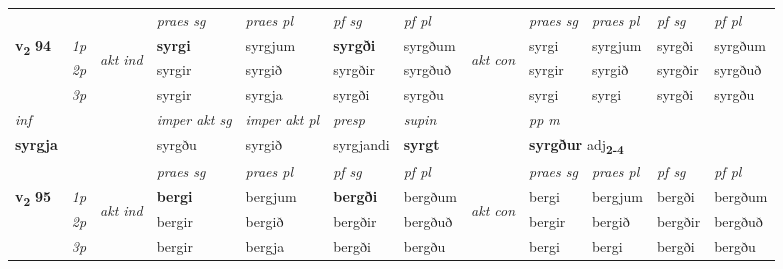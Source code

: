 \begin{longtable}[l]{X>{\footnotesize\itshape}llXXXXlXXXX}
\midrule

 & &   & \textit{praes sg}  & \textit{praes pl}    & \textit{ pf sg} & \textit{pf pl} & & \textit{praes sg}  & \textit{praes pl}    & \textit{pf sg} & \textit{pf pl }  \\ \cmidrule{4-7} \cmidrule{9-12}
 \multirow{2}{*}{{{\textbf{v{\textsubscript{2}}} \Large{\textbf{94}}}}}  & 1p & \multirow{3}{*}{\begin{turn}{90}\textit{akt ind}\end{turn}} & \textbf{syrgi} & syrgjum & \textbf{syrgði} & syrgðum & \multirow{3}{*}{\begin{turn}{90}\textit{akt con}\end{turn}} &syrgi & syrgjum & syrgði & syrgðum\\*
 & 2p &  &  syrgir  & syrgið & syrgðir & syrgðuð & & syrgir & syrgið & syrgðir & syrgðuð \\*
 & 3p &  & syrgir & syrgja & syrgði & syrgðu & & syrgi & syrgi& syrgði & syrgðu \\*
\cmidrule{4-7} \cmidrule{9-12}

   {\textit{inf}} & &  & \textit{imper akt sg} & \textit{imper akt pl}   & \textit{presp} & \textit{supin}  && \textit{pp m} \\*
  {\textbf{syrgja}} & && syrgðu  & syrgið   & syrgjandi &  \textbf{syrgt}  && \multicolumn{2}{l}{\textbf{syrgður} adj\textbf{\textsubscript{2-4}}} \\*

\midrule

 & &   & \textit{praes sg}  & \textit{praes pl}    & \textit{ pf sg} & \textit{pf pl} & & \textit{praes sg}  & \textit{praes pl}    & \textit{pf sg} & \textit{pf pl }  \\ \cmidrule{4-7} \cmidrule{9-12}
 \multirow{2}{*}{{{\textbf{v{\textsubscript{2}}} \Large{\textbf{95}}}}}  & 1p & \multirow{3}{*}{\begin{turn}{90}\textit{akt ind}\end{turn}} & \textbf{bergi} & bergjum & \textbf{bergði} & bergðum & \multirow{3}{*}{\begin{turn}{90}\textit{akt con}\end{turn}} &bergi & bergjum & bergði & bergðum\\*
 & 2p &  &  bergir  & bergið & bergðir & bergðuð & & bergir & bergið & bergðir & bergðuð \\*
 & 3p &  & bergir & bergja & bergði & bergðu & & bergi & bergi& bergði & bergðu \\*
\cmidrule{4-7} \cmidrule{9-12}


\end{longtable}
